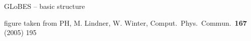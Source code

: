 \documentclass[pdf,ps2pdf,azure,slideColor,colorBG]{prosper}
\begin{document}
\begin{slide}{GLoBES -- basic structure}

{\tiny figure taken from PH, M. Lindner, W. Winter, Comput.\ Phys.\ Commun.\  {\bf 167} (2005) 195}

\end{slide}
\end{document}
